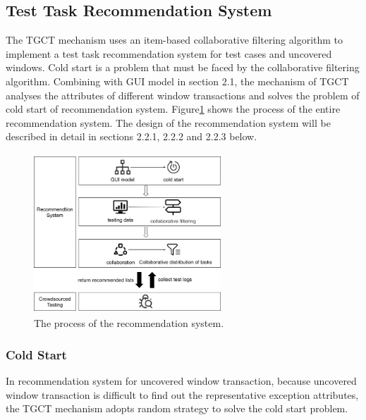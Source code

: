 \subsection{Test Task Recommendation System}
The TGCT mechanism uses an item-based collaborative filtering algorithm to implement a test task recommendation system for test cases and uncovered windows. Cold start is a problem that must be faced by the collaborative filtering algorithm. Combining with GUI model in section 2.1, the mechanism of TGCT analyses the attributes of different window transactions and solves the problem of cold start of recommendation system.  Figure\ref{fig:recomd} shows the process of the entire recommendation system. The design of the recommendation system will be described in detail in sections 2.2.1, 2.2.2 and 2.2.3 below.
\begin{figure}[htbp]
\centering
\centerline{\includegraphics[width=7cm,height=6cm]{fig/7.png}}
\caption{The process of the recommendation system.}
\label{fig:recomd}
\end{figure}

\subsubsection{Cold Start}
In recommendation system for uncovered window transaction, because uncovered window transaction is difficult to find out the representative exception attributes, the TGCT mechanism adopts random strategy to solve the cold start problem. 


